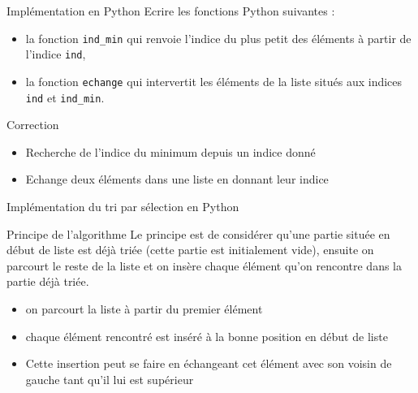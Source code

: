 \documentclass[10pt]{beamer}
\begin{document}
\begin{frame}{\Ctitle}{\stitle}
	\begin{block}{Implémentation en Python}
		Ecrire les fonctions Python suivantes :
		\begin{itemize}
			\item<2-> la fonction \texttt{ind\_min} qui renvoie l'indice du plus petit des éléments  à partir de l'indice \texttt{ind},
			\item<3-> la fonction \texttt{echange} qui intervertit les éléments de la liste situés aux indices \texttt{ind} et \texttt{ind\_min}.
		\end{itemize}
	\end{block}
\end{frame}


\begin{frame}[fragile]{\Ctitle}{\stitle}
	\begin{exampleblock}{Correction}
		\begin{itemize}
			\item Recherche de l'indice du minimum depuis un indice donné
			\item Echange deux éléments dans une liste en donnant leur indice
		\end{itemize}
	\end{exampleblock}
\end{frame}


\begin{frame}[fragile]{\Ctitle}{\stitle}
	\begin{exampleblock}{Implémentation du tri par sélection en Python}
	\end{exampleblock}
\end{frame}

\begin{frame}{\Ctitle}{\stitle}
	\begin{alertblock}{Principe de l'algorithme}
        Le principe est de considérer qu'une partie située en début de liste est déjà triée (cette partie est initialement vide), ensuite on parcourt le reste de la liste et on insère chaque élément qu'on rencontre dans la partie déjà triée.
		\begin{itemize}
			\item<1-> on parcourt la liste à partir du premier élément
			\item<2-> chaque élément rencontré est inséré à la bonne position en début de liste
			\item<3-> Cette insertion peut se faire en échangeant cet élément avec son voisin de gauche tant qu'il lui est supérieur
		\end{itemize}
	\end{alertblock}
\end{frame}
\end{document}
